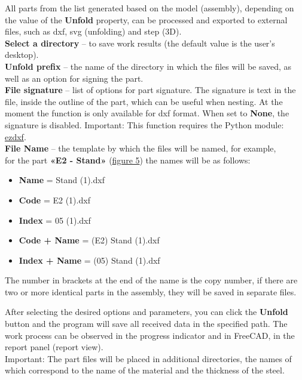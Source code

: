 \documentclass[a4paper,12pt]{article}
\begin{document}
All parts from the list generated based on the model (assembly), depending on the value of the \textbf{Unfold} property, can be processed and exported to external files, such as dxf, svg (unfolding) and step (3D).\\

\textbf{Select a directory} -- to save work results (the default value is the user's desktop).\\

\textbf{Unfold prefix} -- the name of the directory in which the files will be saved, as well as an option for signing the part.\\

\textbf{File signature} -- list of options for part signature. The signature is text in the file, inside the outline of the part, which can be useful when nesting. At the moment the function is only available for dxf format. When set to \textbf{None}, the signature is disabled. Important: This function requires the Python module: \href{https://pypi.org/project/ezdxf}{ezdxf}.\\

\textbf{File Name} -- the template by which the files will be named, for example,\\for the part \textbf{«E2 - Stand»} (\hyperref[sec:properties]{figure 5}) the names will be as follows:
\begin{itemize}
	\item \textbf{Name} = Stand (1).dxf
	\item \textbf{Code} = E2 (1).dxf
	\item \textbf{Index} = 05 (1).dxf
	\item \textbf{Code + Name} = (E2) Stand (1).dxf
	\item \textbf{Index + Name} = (05) Stand (1).dxf
\end{itemize}

The number in brackets at the end of the name is the copy number, if there are two or more identical parts in the assembly, they will be saved in separate files.\\

\pagebreak

After selecting the desired options and parameters, you can click the \textbf{Unfold} button and the program will save all received data in the specified path. The work process can be observed in the progress indicator and in FreeCAD, in the report panel (report view).\\

Important: The part files will be placed in additional directories, the names of which correspond to the name of the material and the thickness of the steel.
\end{document}
